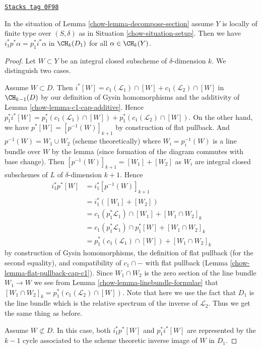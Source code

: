 \begin{lemma}
\label{chow-lemma-decompose-section-formulae}
\href{https://stacks.math.columbia.edu/tag/0F98}{\texttt{Stacks tag 0F98}}

In the situation of Lemma \ref{chow-lemma-decompose-section}
assume $Y$ is locally of finite type over $(S, \delta)$ as in
Situation \ref{chow-situation-setup}. Then we have
$i_1^*p^*\alpha = p_1^*i^*\alpha$
in $\CH_k(D_1)$ for all $\alpha \in \CH_k(Y)$.
\end{lemma}

\begin{proof}

Let $W \subset Y$ be an integral closed subscheme of $\delta$-dimension $k$.
We distinguish two cases.

\medskip\noindent
Assume $W \subset D$. Then
$i^*[W] = c_1(\mathcal{L}_1) \cap [W] + c_1(\mathcal{L}_2) \cap [W]$
in $\CH_{k - 1}(D)$ by our definition of Gysin homomorphisms and the
additivity of Lemma \ref{chow-lemma-c1-cap-additive}.
Hence $p_1^*i^*[W] =
p_1^*(c_1(\mathcal{L}_1) \cap [W]) + p_1^*(c_1(\mathcal{L}_2) \cap [W])$.
On the other hand, we have
$p^*[W] = [p^{-1}(W)]_{k + 1}$ by construction of flat pullback.
And $p^{-1}(W) = W_1 \cup W_2$ (scheme theoretically)
where $W_i = p_i^{-1}(W)$ is a line bundle over $W$
by the lemma (since formation of the diagram commutes with base change).
Then $[p^{-1}(W)]_{k + 1} = [W_1] + [W_2]$ as $W_i$ are integral closed
subschemes of $L$ of $\delta$-dimension $k + 1$. Hence
\begin{align*}
i_1^*p^*[W]
& =
i_1^*[p^{-1}(W)]_{k + 1} \\
& =
i_1^*([W_1] + [W_2]) \\
& =
c_1(p_1^*\mathcal{L}_1) \cap [W_1] + [W_1 \cap W_2]_k \\
& =
c_1(p_1^*\mathcal{L}_1) \cap p_1^*[W] + [W_1 \cap W_2]_k \\
& =
p_1^*(c_1(\mathcal{L}_1) \cap [W]) + [W_1 \cap W_2]_k
\end{align*}
by construction of Gysin homomorphisms, the definition of flat pullback
(for the second equality), and compatibility of $c_1 \cap -$
with flat pullback (Lemma \ref{chow-lemma-flat-pullback-cap-c1}).
Since $W_1 \cap W_2$ is the zero section of the line bundle
$W_1 \to W$ we see from Lemma \ref{chow-lemma-linebundle-formulae}
that $[W_1 \cap W_2]_k = p_1^*(c_1(\mathcal{L}_2) \cap [W])$.
Note that here we use the fact that $D_1$ is the line bundle
which is the relative spectrum of the inverse of $\mathcal{L}_2$.
Thus we get the same thing as before.

\medskip\noindent
Assume $W \not \subset D$. In this case, both $i_1^*p^*[W]$
and $p_1^*i^*[W]$ are represented by the $k - 1$ cycle associated
to the scheme theoretic inverse image of $W$ in $D_1$.
\end{proof}

